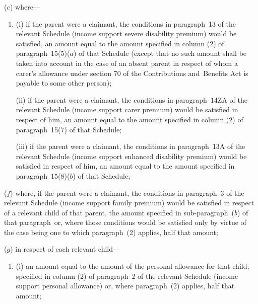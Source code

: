 \documentclass[12pt,a4paper]{article}
\begin{document}
\begin{enumerate}
($e$) where—
\begin{enumerate}\item[]
(i) if the parent were a claimant, the conditions in paragraph~13 of the relevant Schedule (income support severe disability premium) would be satisfied, an amount equal to the amount specified in column (2) of paragraph~15(5)($a$) of that Schedule (except that no such amount shall be taken into account in the case of an absent parent in respect of whom 
a carer’s allowance  %
under section 70 of the Contributions and~Benefits Act is payable to some other person);

\begin{sloppypar}
(ii) if the parent were a claimant, the conditions in paragraph~14ZA of the relevant Schedule (income support carer premium) would be satisfied in respect of him, an amount equal to the amount specified in column (2) of paragraph~15(7) of that Schedule;
\end{sloppypar}

\begin{sloppypar}
(iii) if the parent were a claimant, the conditions in paragraph~13A of the relevant Schedule (income support enhanced disability premium) would be satisfied in respect of him, an amount equal to the amount specified in paragraph~15(8)($b$)  of that Schedule;
\end{sloppypar}
\end{enumerate}

($f$) where, if the parent were a claimant, the conditions in paragraph~3 of the relevant Schedule (income support family premium) would be satisfied in respect of a relevant child of that parent, 
the amount specified in 
sub-paragraph~($b$) of  %
that paragraph~or, where those conditions would be satisfied only by virtue of the case being one to which paragraph~(2) applies, half that amount;

($g$) in respect of each relevant child—
\begin{enumerate}\item[]
(i) an amount equal to the amount of the personal allowance for that child, specified in column (2) of paragraph~2 of the relevant Schedule (income support personal allowance) or, where paragraph~(2) applies, half that amount;


\end{enumerate}
\end{enumerate}
\end{document}
